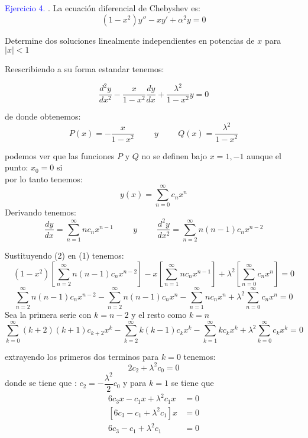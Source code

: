 \textcolor{blue}{Ejercicio 4.}
. La ecuación diferencial de Chebyshev es:
\begin{equation}
   (1-x^2)y''-xy'+\alpha^2y=0 
\end{equation}


Determine dos soluciones linealmente independientes en potencias de $x$ para $\left|x\right| < 1$

Reescribiendo a su forma estandar tenemos:

$$\dfrac{d^{2}y}{dx^{2}} -\dfrac{x}{1 -x^{2}} \dfrac{dy}{dx} + \dfrac{\lambda^{2}}{1 -x^{2}} y = 0
$$

de donde obtenemos:
$$P(x) = -\dfrac{x}{1 -x^{2}} \hspace{1cm} y \hspace{1cm} Q(x) = \dfrac{\lambda^{2}}{1 -x^{2}}$$

podemos ver que las funciones $P$ y $Q$ no se definen bajo $x=1,-1$ aunque el punto: $x_0=0$ si \\
por lo tanto tenemos:
$$y(x) = \sum_{n = 0}^{\infty}c_{n}x^{n}$$
Derivando tenemos:
\begin{equation}[2]
\dfrac{dy}{dx} = \sum_{n = 1}^{\infty}nc_{n}x^{n -1} \hspace{1cm} y \hspace{1cm} \dfrac{d^{2}y}{dx^{2}} = \sum_{n = 2}^{\infty}n(n -1)c_{n}x^{n -2}
\end{equation}

Sustituyendo (2) en (1) tenemos: 
$$(1 -x^{2}) \left[ \sum_{n = 2}^{\infty}n(n-1)c_{n}x^{n-2} \right] -x \left[ \sum_{n = 1}^{\infty}nc_{n}x^{n -1} \right] + \lambda^{2} \left[ \sum_{n = 0}^{\infty}c_{n}x^{n} \right] = 0$$
$$\sum_{n = 2}^{\infty}n(n -1)c_{n}x^{n -2} -\sum_{n = 2}^{\infty}n(n -1)c_{n}x^{n} -\sum_{n = 1}^{\infty}nc_{n}x^{n} + \lambda^{2} \sum_{n = 0}^{\infty}c_{n}x^{n} = 0$$
Sea la primera serie con $k=n-2$ y el resto como $k=n$
$$\sum_{k = 0}^{\infty}(k + 2)(k + 1)c_{k + 2}x^{k} -\sum_{k = 2}^{\infty}k(k -1)c_{k}x^{k} -\sum_{k = 1}^{\infty}kc_{k}x^{k}+\lambda^{2} \sum_{k = 0}^{\infty}c_{k}x^{k} = 0$$

extrayendo los primeros dos terminos para $k=0$ tenemos:
$$2c_{2} + \lambda^{2}c_{0} = 0$$
donde se tiene que : $c_{2} = -\dfrac{\lambda^{2}}{2}c_{0}$
y para $k=1$ se tiene que
\begin{align*}
6c_{3}x -c_{1}x + \lambda^{2}c_{1}x &= 0 \\
 [6c_{3} -c_{1} + \lambda^{2}c_{1}]x &= 0 \\
 6c_{3} -c_{1} + \lambda^{2}c_{1} &= 0
\end{align*}

